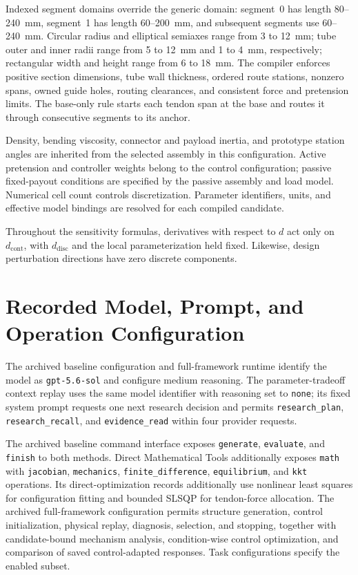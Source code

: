\documentclass[10pt]{article}
\begin{document}
Indexed segment domains override the generic domain: segment~0 has length 80--240~mm, segment~1 has length 60--200~mm, and subsequent segments use 60--240~mm. Circular radius and elliptical semiaxes range from 3 to 12~mm; tube outer and inner radii range from 5 to 12~mm and 1 to 4~mm, respectively; rectangular width and height range from 6 to 18~mm. The compiler enforces positive section dimensions, tube wall thickness, ordered route stations, nonzero spans, owned guide holes, routing clearances, and consistent force and pretension limits. The base-only rule starts each tendon span at the base and routes it through consecutive segments to its anchor.

Density, bending viscosity, connector and payload inertia, and prototype station angles are inherited from the selected assembly in this configuration. Active pretension and controller weights belong to the control configuration; passive fixed-payout conditions are specified by the passive assembly and load model. Numerical cell count controls discretization. Parameter identifiers, units, and effective model bindings are resolved for each compiled candidate.

Throughout the sensitivity formulas, derivatives with respect to $d$ act only on $d_{\mathrm{cont}}$, with $d_{\mathrm{disc}}$ and the local parameterization held fixed. Likewise, design perturbation directions have zero discrete components.



\section{Recorded Model, Prompt, and Operation Configuration}

The archived baseline configuration and full-framework runtime identify the model as \texttt{gpt-5.6-sol} and configure medium reasoning. The parameter-tradeoff context replay uses the same model identifier with reasoning set to \texttt{none}; its fixed system prompt requests one next research decision and permits \texttt{research\_plan}, \texttt{research\_recall}, and \texttt{evidence\_read} within four provider requests.

{\raggedright The archived baseline command interface exposes \texttt{generate}, \texttt{evaluate}, and \texttt{finish} to both methods. Direct Mathematical Tools additionally exposes \texttt{math} with \texttt{jacobian}, \texttt{mechanics}, \texttt{finite\_difference}, \texttt{equilibrium}, and \texttt{kkt} operations. Its direct-optimization records additionally use nonlinear least squares for configuration fitting and bounded SLSQP for tendon-force allocation. The archived full-framework configuration permits structure generation, control initialization, physical replay, diagnosis, selection, and stopping, together with candidate-bound mechanism analysis, condition-wise control optimization, and comparison of saved control-adapted responses. Task configurations specify the enabled subset.\par}
\end{document}
